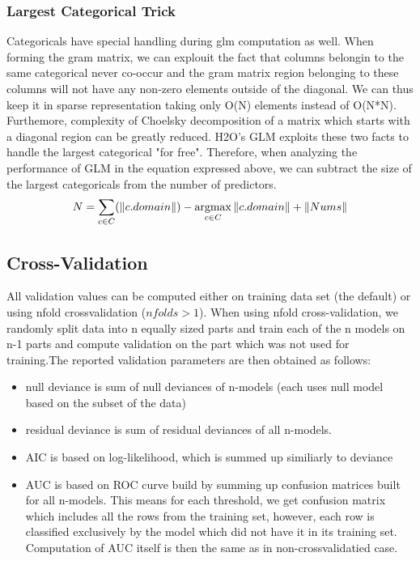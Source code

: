 \documentclass[11pt]{article}
\newcommand{\argmax}{\operatornamewithlimits{argmax}}
\begin{document}
\subsubsection{Largest Categorical Trick}
Categoricals have special handling during glm computation as well. When forming the gram matrix, we can explouit the fact that columns belongin to the same categorical never co-occur and the gram matrix region belonging to these columns will not have any non-zero elements outside of the diagonal. We can thus keep it in sparse representation taking only O(N) elements instead of O(N*N). Furthemore, complexity of Choelsky decomposition of a matrix which starts with a diagonal region can be greatly reduced. H2O's GLM exploits these two facts to handle the largest categorical "for free". Therefore, when analyzing the performance of GLM in the equation expressed above, we can subtract the size of the largest categoricals from the number of predictors.
\[ N = \sum\limits_{c \in C} (\|c.domain\|) - \argmax\limits_{c \in C} \|c.domain\|  + \| Nums \| \]

\subsection{Cross-Validation}
All validation values can be computed either on training data set (the default) or using nfold crossvalidation ($nfolds > 1$). When using nfold cross-validation, we randomly split data into n equally sized parts and train each of the n models on n-1 parts and compute validation on the part which was not used for training.The reported validation parameters are then obtained as follows:
\begin{itemize} 
\item null deviance is sum of null deviances of n-models (each uses null model based on the subset of the data)
\item residual deviance is sum of residual deviances of all n-models.
\item AIC is based on log-likelihood, which is summed up similiarly to deviance
\item AUC is based on ROC curve build  by summing up confusion matrices built for all n-models.
This means for each threshold, we get confusion matrix which includes all the rows from
the training set, however, each row is classified exclusively by the model
which did not have it in its training set. Computation of AUC itself is then the same as in non-crossvalidatied case. 
\end{itemize}
\end{document}
